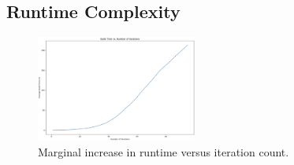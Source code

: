 \subsection{Runtime Complexity}\label{sec:results:complexity}
\begin{figure}
    \centering
    \includegraphics[width=0.47\textwidth]{img/runtime.png}
    \caption{Marginal increase in runtime versus iteration count.}\label{fig:runtime}
    \Description[]{}
\end{figure}